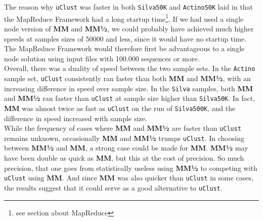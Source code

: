 \documentclass[../../main.tex]{subfiles}
\begin{document}
The reason why {\tt uClust} was faster in both {\tt Silva50K} and {\tt Actino50K} laid in that the MapReduce Framework had a long startup time\footnote{see section about MapReduce}. If we had used a single node version of {\bf MM} and {\bf MM½}, we could probably have achieved much higher speeds at samples sizes of 50000 and less, since it would have no startup time. The MapReduce Framework would therefore first be advantageous to a single node solution using input files with 100.000 sequences or more.\\

Overall, there was a duality of speed between the two sample sets. In the \texttt{Actino} sample set, \texttt{uClust} consistently ran faster than both {\bf MM} and {\bf MM½}, with an increasing difference in speed over sample size. In the \texttt{Silva} samples, both {\bf MM} and {\bf MM½} ran faster than \texttt{uClust} at sample size higher than {\tt Silva50K}. In fact, {\bf MM} was almost twice as fast as \texttt{uClust} on the run of \texttt{Silva500K}, and the difference in speed increased with sample size.\\

While the frequency of cases where {\bf MM} and {\bf MM½} are faster than {\tt uClust} remains unknown, occasionally {\bf MM} and {\bf MM½} trumps \texttt{uClust}. In choosing between {\bf MM½} and {\bf MM}, a strong case could be made for {\bf MM}. {\bf MM½} may have been double as quick as {\bf MM}, but this at the cost of precision. So much precision, that one goes from statistically useless using {\bf MM½} to competing with \texttt{uClust} using {\bf MM}. And since {\bf MM} was also quicker than {\tt uClust} in some cases, the results suggest that it could serve as a good alternative to \texttt{uClust}.\\
\end{document}

